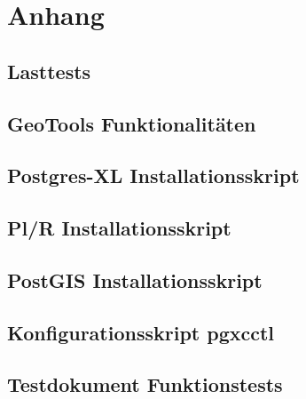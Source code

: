 






\frontmatter												%


\tableofcontents										%

\printglossary[title=Glossar] 			%
\printglossary[type=\acronymtype,title=Abk\"urzungsverzeichnis]	%

\listoffigures											%
\listoftables												%

\mainmatter													%


\appendix
\chapter{Anhang}
\section{Lasttests}
	
\section{GeoTools Funktionalitäten}
	
\section{Postgres-XL Installationsskript}
	
\section{Pl/R Installationsskript}

\section{PostGIS Installationsskript}

\section{Konfigurationsskript pgxcctl}

\section{Testdokument Funktionstests}

												

\pagestyle{empty}


